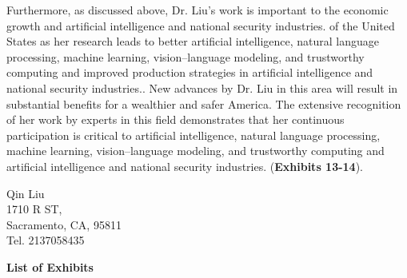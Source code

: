 \documentclass{article}
\begin{document}
Furthermore, as discussed above, Dr. Liu's work is important to the economic growth and artificial intelligence and national security industries. of the United States as her research leads to better artificial intelligence, natural language processing, machine learning, vision–language modeling, and trustworthy computing and improved production strategies in artificial intelligence and national security industries.. New advances by Dr. Liu in this area will result in substantial benefits for a wealthier and safer America. The extensive recognition of her work by experts in this field demonstrates that her continuous participation is critical to artificial intelligence, natural language processing, machine learning, vision–language modeling, and trustworthy computing and artificial intelligence and national security industries. (\textbf{Exhibits 13-14}).




\vspace{2\baselineskip}

Qin Liu\\
1710 R ST,\\
Sacramento, CA, 95811\\
Tel. 2137058435
\clearpage

{\bf List of Exhibits}
\label{exhib}
\end{document}
